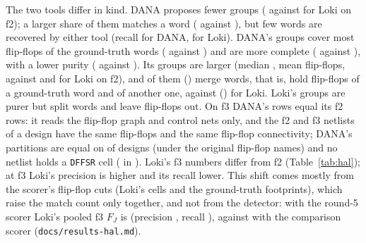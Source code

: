 \documentclass[conference]{IEEEtran}
\newcommand{\code}[1]{\texttt{#1}}
\begin{document}
The two tools differ in kind. DANA proposes fewer groups (\halHalEightFTwoGroups{} against
\halLokiWFTwoGroups{} for Loki on f2); a larger share of them matches a word
(\halHalEightFTwoPrecJ{} against \halLokiWFTwoPrecJ{}), but few words are recovered by either
tool (recall \halHalEightFTwoRecJ{} for DANA, \halLokiWFTwoRecJ{} for Loki). DANA's groups
cover most flip-flops of the ground-truth words (\halHalEightFTwoCover{} against
\halLokiWFTwoCover{}) and are more complete (\halHalEightFTwoCompl{} against
\halLokiWFTwoCompl{}), with a lower purity (\halHalEightFTwoPurity{} against
\halLokiWFTwoPurity{}). Its groups are larger (median \halHalEightFTwoMedian{}, mean
\halHalEightFTwoMean{} flip-flops, against \halLokiWFTwoMedian{} and \halLokiWFTwoMean{} for Loki
on f2), and \halHalEightFTwoMergeShare{} of them (\halHalEightFTwoMerge{}) merge words, that is,
hold flip-flops of a ground-truth word and of another one, against \halLokiWFTwoMergeShare{}
(\halLokiWFTwoMerge{}) for Loki. Loki's groups are purer but split words and leave flip-flops out.
On f3 DANA's rows equal its f2 rows: it reads the flip-flop graph and control nets only, and the
f2 and f3 netlists of a design have the same flip-flops and the same flip-flop connectivity; DANA's
partitions are equal on \halFFEqual{} of \halFFDesigns{} designs (under the original flip-flop
names) and no netlist holds a \code{DFFSR} cell (\halDffsrCells{} in \halDffsrNetlists{}).
Loki's f3 numbers differ from f2 (Table~\ref{tab:hal}); at f3 Loki's precision is higher and its
recall lower. This shift comes mostly from the scorer's flip-flop cuts (Loki's cells and the
ground-truth footprints), which raise the match count only together, and not from the detector:
with the round-5 scorer Loki's pooled f3 $F_J$ is \halRFiveFThreeFJ{} (precision
\halRFiveFThreePrecJ{}, recall \halRFiveFThreeRecJ{}), against \halLokiWFThreeFJ{} with the
comparison scorer (\code{docs/results-hal.md}).
\end{document}
